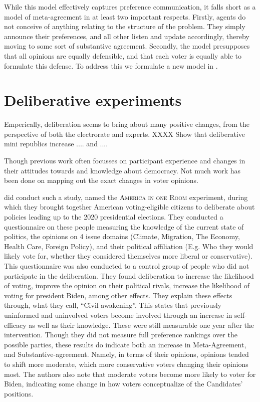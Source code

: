 While this model effectively captures preference communication, it falls short
as a model of meta-agreement in at least two important respects. Firstly,
agents do not conceive of anything relating to the structure of the problem.
They simply announce their preferences, and all other listen and update
accordingly, thereby moving to some sort of substantive agreement. Secondly,
the model presupposes that all opinions are equally defensible, and that each
voter is equally able to formulate this defense. To address this we formulate a
new model in .


\section{Deliberative experiments}


Emperically, deliberation seems to bring about many positive changes, from the perspective of both the electrorate and experts. XXXX Show that deliberative mini republics increase .... and .... 

Though previous work often focusses on participant experience and changes in
their attitudes towards and knowledge about democracy. Not much work has been
done on mapping out the exact changes in voter opinions.

\citet{fishkinCanDeliberationHave2024} did conduct such a study, named the
\textsc{America in one Room} experiment, during which they brought together
American voting-eligible citizens to deliberate about policies leading up to the
2020 presidential elections. They conducted a questionnaire on these people
measuring the knowledge of the current state of politics, the opinions on 4
issue domains (Climate, Migration, The Economy, Health Care, Foreign Policy),
and their political affiliation (E.g. Who they would likely vote for, whether
they considered themselves more liberal or conservative). This questionnaire was
also conducted to a control group of people who did not participate in the
deliberation. They found deliberation to increase the likelihood of voting,
improve the opinion on their political rivals, increase the likelihood of voting
for president Biden, among other effects. They explain these effects through,
what they call, ``Civil awakening''. This states that previously uninformed and
uninvolved voters become involved through an increase in self-efficacy as well
as their knowledge. These were still measurable one year after the intervention.
Though they did not measure full preference rankings over the possible parties,
these results do indicate both an increase in Meta-Agreement, and
Substantive-agreement. Namely, in terms of their opinions, opinions tended to
shift more moderate, which more conservative voters changing their opinions
most. The authors also note that moderate voters become more likely to voter for
Biden, indicating some change in how voters conceptualize of the Candidates'
positions.


